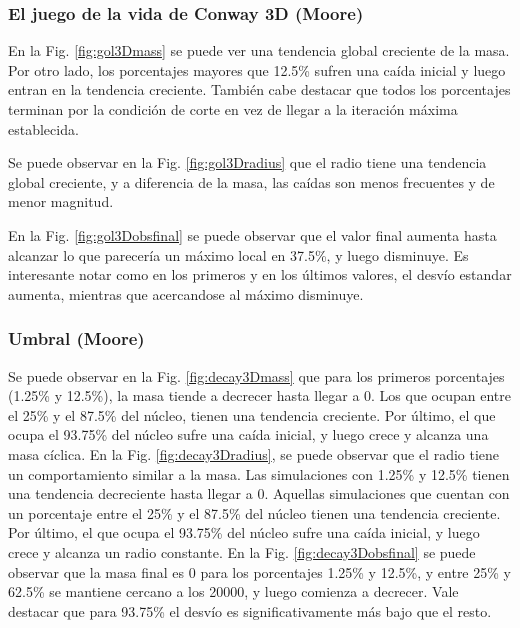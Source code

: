 \subsubsection{El juego de la vida de Conway 3D (Moore)}
En la Fig. \ref{fig:gol3Dmass} se puede ver una tendencia global creciente de la masa.
Por otro lado, los porcentajes mayores que 12.5\% sufren una caída inicial y luego entran en la tendencia creciente.
También cabe destacar que todos los porcentajes terminan por la condición de corte en vez de llegar a la iteración máxima establecida.

Se puede observar en la Fig. \ref{fig:gol3Dradius} que el radio tiene una tendencia global creciente, y a diferencia de la masa, las caídas son menos frecuentes y de menor magnitud.

En la Fig. \ref{fig:gol3Dobsfinal} se puede observar que el valor final aumenta hasta alcanzar lo que parecería un máximo local en 37.5\%, y luego disminuye.
Es interesante notar como en los primeros y en los últimos valores, el desvío estandar aumenta, mientras que acercandose al máximo disminuye.


\subsubsection{Umbral (Moore)}
Se puede observar en la Fig. \ref{fig:decay3Dmass} que para los primeros porcentajes (1.25\% y 12.5\%), la masa tiende a decrecer hasta llegar a $0$.
Los que ocupan entre el 25\% y el 87.5\% del núcleo, tienen una tendencia creciente.
Por último, el que ocupa el 93.75\% del núcleo sufre una caída inicial, y luego crece y alcanza una masa cíclica.
En la Fig. \ref{fig:decay3Dradius}, se puede observar que el radio tiene un comportamiento similar a la masa.
Las simulaciones con 1.25\% y 12.5\% tienen una tendencia decreciente hasta llegar a $0$.
Aquellas simulaciones que cuentan con un porcentaje entre el 25\% y el 87.5\% del núcleo tienen una tendencia creciente.
Por último, el que ocupa el 93.75\% del núcleo sufre una caída inicial, y luego crece y alcanza un radio constante.
En la Fig. \ref{fig:decay3Dobsfinal} se puede observar que la masa final es 0 para los porcentajes 1.25\% y 12.5\%, y entre 25\% y 62.5\% se mantiene cercano a los 20000, y luego comienza a decrecer. Vale destacar que para 93.75\% el desvío es significativamente más bajo que el resto.

